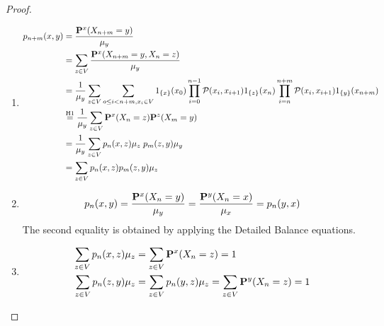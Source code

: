 \documentclass[main]{subfiles}
\begin{document}
\begin{proof}
    \begin{enumerate}
        \item
              \begin{align*}
                  p_{n+m}(x, y) & = \frac{\P^x(X_{n+m} = y)}{\mu_y}                                                                                                                                                                        \\
                                & = \sum_{z \in V} \frac{\P^x(X_{n+m} = y, X_n = z)}{\mu_y}                                                                                                                                                \\
                                & = \frac{1}{\mu_y} \sum_{z \in V} \sum_{o \leq i < n+m, x_i \in V} 1_{\{x\}}(x_0) \prod_{i=0}^{n-1}\mathcal{P}(x_i, x_{i+1}) 1_{\{z\}}(x_n) \prod_{i=n}^{n+m}\mathcal{P}(x_i, x_{i+1}) 1_{\{y\}}(x_{n+m}) \\
                                & \stackrel{\text{H1}}{=} \frac{1}{\mu_y} \sum_{z \in V} \P^x(X_n = z)\P^z(X_m = y)                                                                                                                        \\
                                & = \frac{1}{\mu_y} \sum_{z \in V} p_n(x, z)\mu_z\;p_m(z, y)\mu_y                                                                                                                                          \\
                                & = \sum_{z \in V} p_n(x, z)p_m(z, y)\mu_z                                                                                                                                                                 \\
              \end{align*}
        \item $$p_n(x, y) = \frac{\P^x(X_n = y)}{\mu_y} = \frac{\P^y(X_n = x)}{\mu_x} = p_n(y, x)$$
              The second equality is obtained by applying the Detailed Balance equations.
        \item
              \begin{align*}
                  \sum_{z \in V} p_n(x, z)\mu_z & = \sum_{z \in V} \P^x(X_n = z) = 1                                 \\
                  \sum_{z \in V} p_n(z, y)\mu_z & = \sum_{z \in V} p_n(y, z)\mu_z = \sum_{z \in V} \P^y(X_n = z) = 1 \\
              \end{align*}
    \end{enumerate}
\end{proof}
\end{document}
